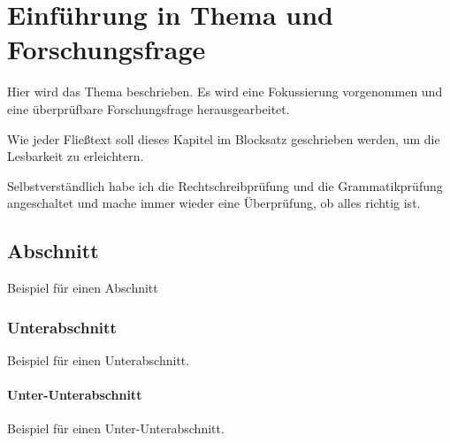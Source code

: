 %

\chapter{Einführung in Thema und Forschungsfrage}


Hier wird das Thema beschrieben. Es wird eine Fokussierung vorgenommen und eine überprüfbare Forschungsfrage herausgearbeitet.

Wie jeder Fließtext soll dieses Kapitel im Blocksatz geschrieben werden, um die Lesbarkeit zu erleichtern.

Selbstverständlich habe ich die Rechtschreibprüfung und die Grammatikprüfung angeschaltet und mache immer wieder eine Überprüfung, ob alles richtig ist.


\section{Abschnitt}

Beispiel für einen Abschnitt


\subsection{Unterabschnitt}

Beispiel für einen Unterabschnitt.

\subsubsection{Unter-Unterabschnitt}
Beispiel für einen Unter-Unterabschnitt.